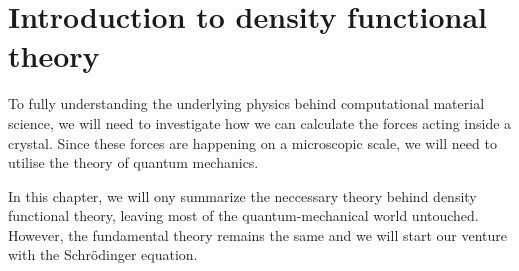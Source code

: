 \chapter{Introduction to density functional theory}

To fully understanding the underlying physics behind computational material science, we will need to investigate how we can calculate the forces acting inside a crystal. Since these forces are happening on a microscopic scale, we will need to utilise the theory of quantum mechanics.

In this chapter, we will ony summarize the neccessary theory behind density functional theory, leaving most of the quantum-mechanical world untouched. However, the fundamental theory remains the same and we will start our venture with the Schrödinger equation.


